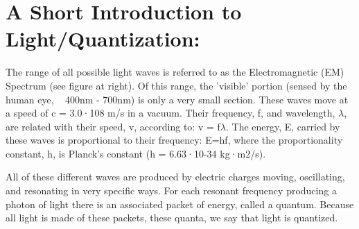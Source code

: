 \section*{A Short Introduction to Light/Quantization:}
The range of all possible light waves is referred to as the Electromagnetic (EM) Spectrum (see figure at right). 
Of this range, the 'visible' portion (sensed by the human eye, ~ 400nm - 700nm) is only a very small section. 
These waves move at a speed of c = 3.0·108 m/s in a vacuum. 
Their frequency, f, and wavelength, $\lambda$, are related with their speed, v, according to: v = f$\lambda$. 
The energy, E, carried by these waves is proportional to their frequency: E=hf, where the proportionality constant, h, is Planck's constant (h = 6.63·10-34 kg·m2/s). 
\par
All of these different waves are produced by electric charges moving, oscillating, and resonating in very specific ways. 
For each resonant frequency producing a photon of light there is an associated packet of energy, called a quantum. 
Because all light is made of these packets, these quanta, we say that light is quantized.

